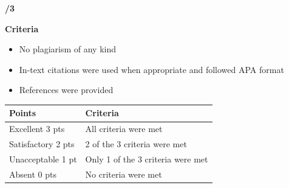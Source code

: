 \documentclass[
]{book}
\providecommand{\tightlist}{%
  \setlength{\itemsep}{0pt}\setlength{\parskip}{0pt}}
\begin{document}
\textbf{/3}

\textbf{Criteria}

\begin{itemize}
\tightlist
\item
  No plagiarism of any kind
\item
  In-text citations were used when appropriate and followed APA format
\item
  References were provided
\end{itemize}

\begin{longtable}[]{@{}ll@{}}
\toprule
Points & Criteria \\
\midrule
\endhead
Excellent 3 pts & All criteria were met \\
Satisfactory 2 pts & 2 of the 3 criteria were met \\
Unacceptable 1 pt & Only 1 of the 3 criteria were met \\
Absent 0 pts & No criteria were met \\
\bottomrule
\end{longtable}
\end{document}
